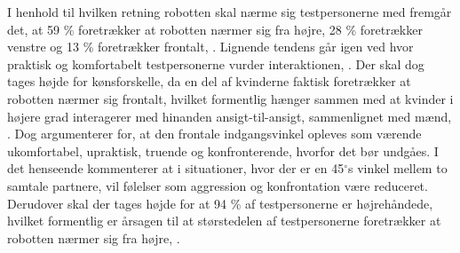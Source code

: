 I henhold til hvilken retning robotten skal nærme sig testpersonerne med fremgår det, at 59 \% foretrækker at robotten nærmer sig fra højre, 28 \% foretrækker venstre og 13 \% foretrækker frontalt, \parencite[s. 175]{PDF:HowMayIServeYou}. Lignende tendens går igen ved hvor praktisk og komfortabelt testpersonerne vurder interaktionen, \parencite[ss. 175-176]{PDF:HowMayIServeYou}. Der skal dog tages højde for kønsforskelle, da en del af kvinderne faktisk foretrækker at robotten nærmer sig frontalt, hvilket formentlig hænger sammen med at kvinder i højere grad interagerer med hinanden ansigt-til-ansigt, sammenlignet med mænd, \parencite[s. 178]{PDF:HowMayIServeYou}. Dog argumenterer \textcite[s. 178]{PDF:HowMayIServeYou} for, at den frontale indgangsvinkel opleves som værende ukomfortabel, upraktisk, truende og konfronterende, hvorfor det bør undgåes. I det henseende kommenterer \textcite[s. 178]{PDF:HowMayIServeYou} at i situationer, hvor der er en 45$^{\circ}$s vinkel mellem to samtale partnere, vil følelser som aggression og konfrontation være reduceret. Derudover skal der tages højde for at 94 \% af testpersonerne er højrehåndede, hvilket formentlig er årsagen til at størstedelen af testpersonerne foretrækker at robotten nærmer sig fra højre, \parencite[s. 175]{PDF:HowMayIServeYou}. 

